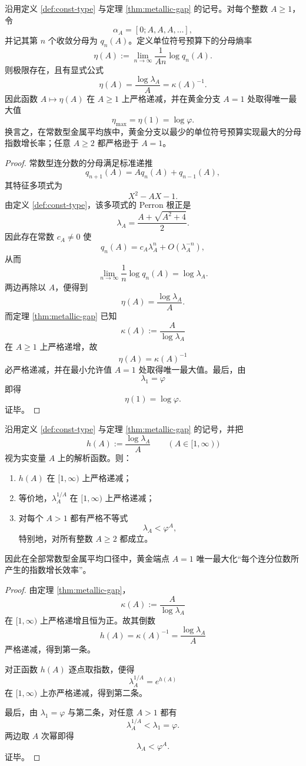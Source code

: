 \begin{theorem}[黄金分支在金属平均族中唯一最大化单位符号预算下的分母熵率]\label{thm:xi-golden-metallic-symbol-budget-entropy-optimality}
沿用定义 \ref{def:const-type} 与定理 \ref{thm:metallic-gap} 的记号。对每个整数 \(A\ge 1\)，令
\[
\alpha_A=[0;A,A,A,\dots],
\]
并记其第 \(n\) 个收敛分母为 \(q_n(A)\)。定义单位符号预算下的分母熵率
\[
\eta(A):=
\lim_{n\to\infty}\frac{1}{An}\log q_n(A).
\]
则极限存在，且有显式公式
\[
\boxed{\;
\eta(A)=\frac{\log\lambda_A}{A}=\kappa(A)^{-1}.\;}
\]
因此函数 \(A\mapsto \eta(A)\) 在 \(A\ge 1\) 上严格递减，并在黄金分支 \(A=1\) 处取得唯一最大值
\[
\boxed{\;
\eta_{\max}=\eta(1)=\log\varphi.\;}
\]
换言之，在常数型金属平均族中，黄金分支以最少的单位符号预算实现最大的分母指数增长率；任意 \(A\ge 2\) 都严格逊于 \(A=1\)。
\end{theorem}
\begin{proof}
常数型连分数的分母满足标准递推
\[
q_{n+1}(A)=Aq_n(A)+q_{n-1}(A),
\]
其特征多项式为
\[
X^2-AX-1.
\]
由定义 \ref{def:const-type}，该多项式的 Perron 根正是
\[
\lambda_A=\frac{A+\sqrt{A^2+4}}{2}.
\]
因此存在常数 \(c_A\neq 0\) 使
\[
q_n(A)=c_A\lambda_A^n+O(\lambda_A^{-n}),
\]
从而
\[
\lim_{n\to\infty}\frac{1}{n}\log q_n(A)=\log\lambda_A.
\]
两边再除以 \(A\)，便得到
\[
\eta(A)=\frac{\log\lambda_A}{A}.
\]
而定理 \ref{thm:metallic-gap} 已知
\[
\kappa(A):=\frac{A}{\log\lambda_A}
\]
在 \(A\ge 1\) 上严格递增，故
\[
\eta(A)=\kappa(A)^{-1}
\]
必严格递减，并在最小允许值 \(A=1\) 处取得唯一最大值。最后，由
\[
\lambda_1=\varphi
\]
即得
\[
\eta(1)=\log\varphi.
\]
证毕。
\end{proof}

\begin{corollary}[金属平均族的逐位指数效率由黄金端点唯一极大化]\label{cor:xi-golden-metallic-perdigit-exponential-efficiency}
沿用定义 \ref{def:const-type} 与定理 \ref{thm:metallic-gap} 的记号，并把
\[
h(A):=\frac{\log\lambda_A}{A}
\qquad (A\in[1,\infty))
\]
视为实变量 \(A\) 上的解析函数。则：
\begin{enumerate}
  \item \(h(A)\) 在 \([1,\infty)\) 上严格递减；
  \item 等价地，\(\lambda_A^{1/A}\) 在 \([1,\infty)\) 上严格递减；
  \item 对每个 \(A>1\) 都有严格不等式
  \[
  \lambda_A<\varphi^A,
  \]
  特别地，对所有整数 \(A\ge 2\) 都成立。
\end{enumerate}
因此在全部常数型金属平均口径中，黄金端点 \(A=1\) 唯一最大化“每个连分位数所产生的指数增长效率”。
\end{corollary}
\begin{proof}
由定理 \ref{thm:metallic-gap}，
\[
\kappa(A):=\frac{A}{\log\lambda_A}
\]
在 \([1,\infty)\) 上严格递增且恒为正。故其倒数
\[
h(A)=\kappa(A)^{-1}=\frac{\log\lambda_A}{A}
\]
严格递减，得到第一条。

对正函数 \(h(A)\) 逐点取指数，便得
\[
\lambda_A^{1/A}=e^{h(A)}
\]
在 \([1,\infty)\) 上亦严格递减，得到第二条。

最后，由 \(\lambda_1=\varphi\) 与第二条，对任意 \(A>1\) 都有
\[
\lambda_A^{1/A}<\lambda_1=\varphi.
\]
两边取 \(A\) 次幂即得
\[
\lambda_A<\varphi^A.
\]
证毕。
\end{proof}

\endinput
